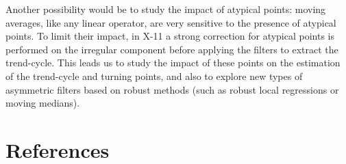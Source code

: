 \documentclass[
]{article}
\newcommand\1{\mathds{1}}
\begin{document}
Another possibility would be to study the impact of atypical points:
moving averages, like any linear operator, are very sensitive to the
presence of atypical points. To limit their impact, in X-11 a strong
correction for atypical points is performed on the irregular component
before applying the filters to extract the trend-cycle. This leads us to
study the impact of these points on the estimation of the trend-cycle
and turning points, and also to explore new types of asymmetric filters
based on robust methods (such as robust local regressions or moving
medians).

\newpage

\section*{References}\label{references}

\printbibliography[heading=none]
\end{document}
